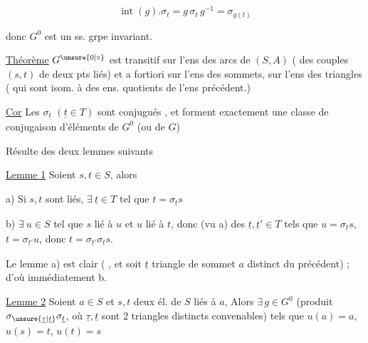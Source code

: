 \[ \operatorname{int}(g).\sigma_t=g\,\sigma_t\,g^{-1}=\sigma_{g(t)} \]

donc $G^0$ est un ss. grpe invariant.

\uline{Théorème} $G^{\unsure{0|\circ}}$ est transitif sur l'ens des arcs de $(S,A)$ ( des couples $(s,t)$ de deux pts liés) et a fortiori sur l'ens des sommets,   sur l'ens des triangles ( qui sont isom. à des ens. quotients de l'ens précédent.)


\uline{Cor} Les $\sigma_{\underline t}$ $(\underline t\in T)$ sont conjugués , et forment exactement une classe de conjugaison d'éléments de $G^0$ (ou de $G$)

Résulte des deux lemmes suivants

\uline{Lemme 1} Soient $s,t\in S$, alors

a) Si $s,t$ sont liés, $\exists\ \underline t\in T$ tel que $t=\sigma_{\underline t}s$

b)   $\exists\ u\in S$ tel que $s$ lié à $u$ et $u$ lié à $t$, donc (vu a) des $\underline t,\underline t'\in T$ tels que $u=\sigma_{\underline t}s$, $t=\sigma_{\underline t'}u$, donc $t=\sigma_{\underline t'}\sigma_{\underline t}s$.

Le lemme a) est clair ( ,  et soit $\underline t$  triangle de sommet $a$ distinct du précédent) ; d'où immédiatement b.

\uline{Lemme 2}  Soient $a\in S$ et $s,t$ deux él. de $S$ liés à $a$,  Alors $\exists\,g\in G^0$ (produit  $\sigma_{\unsure{\underline\tau|\underline t}} \sigma_{\underline t}$, où $\underline\tau,\underline t$ sont $2$ triangles distincts convenables) tels que $u(a)=a$, $u(s)=t$, $u(t)=s$

